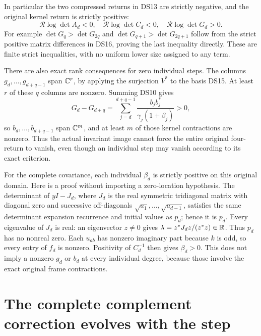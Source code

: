 In particular the two compressed returns in DS13 are strictly negative,
and the original kernel return is strictly positive:
\begin{equation}\label{dsroot:eq:strictreturn}
\boxed{\mathcal R\log\det A_d<0,\quad
\mathcal R\log\det C_d<0,\quad
\mathcal R\log\det G_d>0.}
\tag{DS17}
\end{equation}
For example \(\det G_q>\det G_{2q}\) and
\(\det G_{q+1}>\det G_{2q+1}\) follow from the strict positive
matrix differences in DS16, proving the last inequality directly.
These are finite strict inequalities, with no uniform lower size
assigned to any term.

There are also exact rank consequences for zero individual steps.
The columns \(g_d,\ldots,g_{d+q-1}\) span \(\mathbb C^r\), by applying
the surjection \(V^*\) to the basis DS15. At least \(r\) of these
\(q\) columns are nonzero. Summing DS10 gives
\[
G_d-G_{d+q}=\sum_{j=d}^{d+q-1}
\frac{b_jb_j^*}{\gamma_j(1+\beta_j)}>0,
\]
so \(b_d,\ldots,b_{d+q-1}\) span \(\mathbb C^m\), and at least \(m\)
of those kernel contractions are nonzero. Thus the actual invariant
image cannot force the entire original four-return to vanish, even
though an individual step may vanish according to its exact criterion.

For the complete covariance, each individual \(\beta_d\) is strictly
positive on this original domain. Here is a proof without importing a
zero-location hypothesis. The determinant of \(yI-J_d\), where
\(J_d\) is the real symmetric tridiagonal matrix with diagonal zero
and successive off-diagonals \(\sqrt{a_1},\ldots,\sqrt{a_{d-1}}\),
satisfies the same determinant expansion recurrence and initial values
as \(p_d\); hence it is \(p_d\). Every eigenvalue of \(J_d\) is
real: an eigenvector \(z\ne0\) gives
\(\lambda=z^*J_dz/(z^*z)\in\mathbb R\). Thus \(p_d\) has no nonreal
zero. Each \(u_{ab}\) has nonzero imaginary part because \(k\) is
odd, so every entry of \(f_d\) is nonzero. Positivity of
\(C_d^{-1}\) then gives \(\beta_d>0\). This does not imply a
nonzero \(g_d\) or \(b_d\) at every individual degree, because those
involve the exact original frame contractions.

\section{The complete complement correction evolves with the step}

